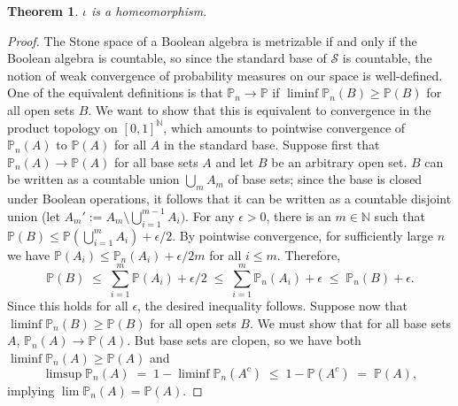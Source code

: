 \documentclass[12pt]{article}
\newcommand{\PP}{\mathbb{P}}
\newcommand{\NN}{\mathbb{N}}
\newcommand{\cS}{\mathcal{S}}
\theoremstyle{plain}
\newtheorem{theorem}{Theorem}[subsection]
\theoremstyle{definition}
\theoremstyle{remark}
\begin{document}
\begin{theorem}
$\iota$ is a homeomorphism.
\end{theorem}
\begin{proof}
The Stone space of a Boolean algebra is metrizable if and only if the Boolean algebra is countable, so since the standard base of $\cS$ is countable, the notion of weak convergence of probability measures on our space is well-defined. One of the equivalent definitions is that $\PP_n\to\PP$ if $\liminf\PP_n(B)\ge\PP(B)$ for all open sets $B$. We want to show that this is equivalent to convergence in the product topology on $[0,1]^\NN$, which amounts to pointwise convergence of $\PP_n(A)$ to $\PP(A)$ for all $A$ in the standard base.
Suppose first that $\PP_n(A)\to\PP(A)$ for all base sets $A$ and let $B$ be an arbitrary open set. $B$ can be written as a countable union $\textstyle\bigcup_m A_m$ of base sets; since the base is closed under Boolean operations, it follows that it can be written as a countable disjoint union (let $\textstyle A_m' := A_m\setminus\bigcup_{i=1}^{m-1}A_i)$. For any $\epsilon>0$, there is an $m\in\mathbb{N}$ such that $\textstyle\PP(B)\le\PP(\bigcup_{i=1}^m A_i)+\epsilon/2$. By pointwise convergence, for sufficiently large $n$ we have $\PP(A_i)\le\PP_n(A_i) + \epsilon/2m$ for all $i\le m$. Therefore,
\[
\textstyle\PP(B)\;\le\;\sum_{i=1}^m\PP(A_i)+\epsilon/2\;\le\;\sum_{i=1}^m\PP_n(A_i) + \epsilon\;\le\;\PP_n(B)+\epsilon.
\]
Since this holds for all $\epsilon$, the desired inequality follows.
Suppose now that $\liminf\PP_n(B)\ge\PP(B)$ for all open sets $B$. We must show that for all base sets $A$, $\PP_n(A)\to\PP(A)$. But base sets are clopen, so we have both $\liminf\PP_n(A)\ge\PP(A)$ and
\[
\limsup\PP_n(A) \;=\; 1-\liminf\PP_n(A^c) \;\le\; 1 - \PP(A^c) \;=\; \PP(A),
\]
implying $\lim\PP_n(A) = \PP(A)$.
\end{proof}
\end{document}
